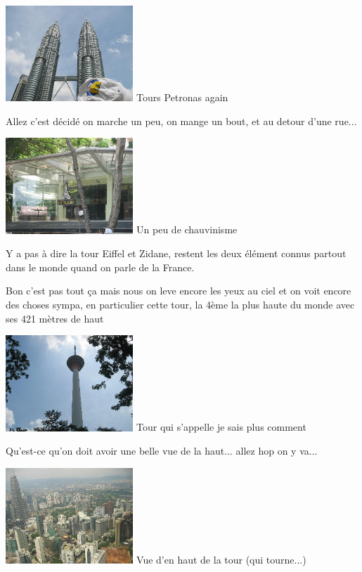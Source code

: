 \begin{multicols}{2}
\hspace*{-0.65cm}
\includegraphics[width=4.8cm]{articles/Kuala-lumpur/1210432316GlgU.jpg}
Tours Petronas again

Allez c'est décidé on marche un peu, on mange un bout, et au detour d'une rue...

\hspace*{-0.65cm}
\includegraphics[width=4.8cm]{articles/Kuala-lumpur/1211015560vRGE.jpg}
Un peu de chauvinisme

Y a pas à dire la tour Eiffel et Zidane, restent les deux élément connus partout dans le monde quand on parle de la France.

Bon c'est pas tout ça mais nous on leve encore les yeux au ciel et on voit encore des choses sympa, en particulier cette tour, la 4ème la plus haute du monde avec ses 421 mètres de haut

\hspace*{-0.65cm}
\includegraphics[width=4.8cm]{articles/Kuala-lumpur/1211014906Nl6S.jpg}
Tour qui s'appelle je sais plus comment

Qu'est-ce qu'on doit avoir une belle vue de la haut... allez hop on y va...

\hspace*{-0.65cm}
\includegraphics[width=4.8cm]{articles/Kuala-lumpur/1211014913RrBL.jpg}
Vue d'en haut de la tour (qui tourne...)


\end{multicols}
